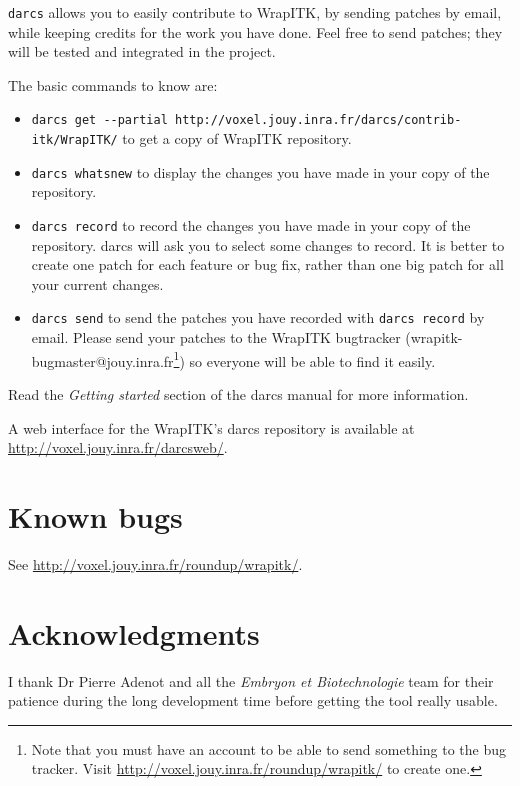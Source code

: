 \documentclass{InsightArticle}
\begin{document}
\verb$darcs$ \cite{DarcsWebSite} allows you to easily contribute to WrapITK, by sending
patches by email, while keeping credits for the work you have done.
Feel free to send patches; they will be tested and integrated in the project.

The basic commands to know are:
\begin{itemize}

  \item \verb$darcs get --partial http://voxel.jouy.inra.fr/darcs/contrib-itk/WrapITK/$
to get a copy of WrapITK repository.

  \item \verb$darcs whatsnew$ to display the changes you have made in
your copy of the repository.

  \item \verb$darcs record$ to record the changes you have made in your
copy of the repository. darcs will ask you to select some changes
to record. It is better to create one patch for each feature or bug
fix, rather than one big patch for all your current changes.

  \item \verb$darcs send$ to send the patches you have recorded with
\verb$darcs record$ by email. Please send your patches to the WrapITK bugtracker
(wrapitk-bugmaster@jouy.inra.fr\footnote{Note that you must have an account to
be able to send something to the bug tracker. Visit
\url{http://voxel.jouy.inra.fr/roundup/wrapitk/} to create one.}) so everyone
will be able to find it easily.

\end{itemize}

Read the {\em Getting started} section of the darcs manual \cite{DarcsWebSite}
for more information.

A web interface \cite{DarcswebWebSite} for the WrapITK's darcs
repository is available at \url{http://voxel.jouy.inra.fr/darcsweb/}.


\newpage
\part{Known bugs}
See \url{http://voxel.jouy.inra.fr/roundup/wrapitk/}.

\newpage
\part{Acknowledgments}
I thank Dr Pierre Adenot and all the {\em Embryon et Biotechnologie} team for their
patience during the long development time before getting the tool really usable.
\end{document}
